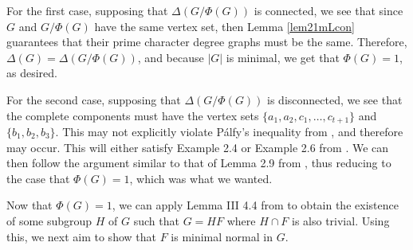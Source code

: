 \documentclass[11pt]{amsart}
\theoremstyle{definition}
\theoremstyle{remark}
\numberwithin{equation}{section}
\begin{document}
For the first case, supposing that $\Delta(G/\Phi(G))$ is connected, we see that since $G$ and $G/\Phi(G)$ have the same vertex set, then Lemma \ref{lem21mLcon} guarantees that their prime character degree graphs must be the same. Therefore, $\Delta(G)=\Delta(G/\Phi(G))$, and because $|G|$ is minimal, we get that $\Phi(G)=1$, as desired.

For the second case, supposing that $\Delta(G/\Phi(G))$ is disconnected, we see that the complete components must have the vertex sets $\{a_1,a_2,c_1,\ldots,c_{t+1}\}$ and $\{b_1,b_2,b_3\}$. This may not explicitly violate P\'alfy's inequality from \cite{P2}, and therefore may occur. This will either satisfy Example 2.4 or Example 2.6 from \cite{L}. We can then follow the argument similar to that of Lemma 2.9 from \cite{BLL2}, thus reducing to the case that $\Phi(G)=1$, which was what we wanted.

Now that $\Phi(G)=1$, we can apply Lemma III 4.4 from \cite{H} to obtain the existence of some subgroup $H$ of $G$ such that $G=HF$ where $H\cap F$ is also trivial. Using this, we next aim to show that $F$ is minimal normal in $G$.
\end{document}
